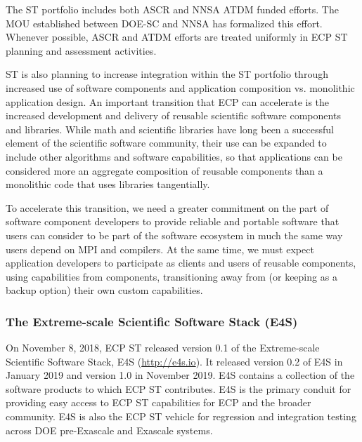 The ST portfolio includes both ASCR and NNSA ATDM funded efforts. The MOU established between DOE-SC and NNSA has formalized this effort.  Whenever possible, ASCR and ATDM efforts are treated uniformly in ECP ST planning and assessment activities.

ST is also planning to increase integration within the ST portfolio through increased use of software components and application composition vs. monolithic application design. An important transition that ECP can accelerate is the increased development and delivery of reusable scientific software components and libraries. While math and scientific libraries have long been a successful element of the scientific software community, their use can be expanded to include other algorithms and software capabilities, so that applications can be considered more an aggregate composition of reusable components than a monolithic code that uses libraries tangentially.

To accelerate this transition, we need a greater commitment on the part of software component developers to provide reliable and portable software that users can consider to be part of the software ecosystem in much the same way users depend on MPI and compilers. At the same time, we must expect application developers to participate as clients and users of reusable components, using capabilities from components, transitioning away from (or keeping as a backup option) their own custom capabilities.

\subsubsection{The Extreme-scale Scientific Software Stack (E4S)}\label{subsubsect:e4s}
On November 8, 2018, ECP ST released version 0.1 of the Extreme-scale Scientific Software Stack, E4S (\url{http://e4s.io}). It released version 0.2 of E4S in January 2019 and version 1.0 in November 2019. E4S contains a collection of the software products to which ECP ST contributes.  E4S is the primary conduit for providing easy access to ECP ST capabilities for ECP and the broader community.  E4S is also the ECP ST vehicle for regression and integration testing across DOE pre-Exascale and Exascale systems.

